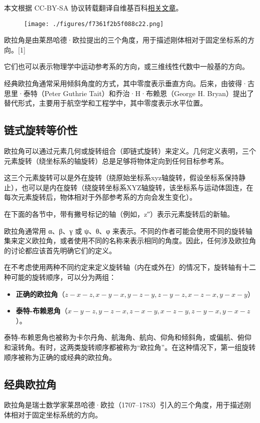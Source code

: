 
本文根据 CC-BY-SA 协议转载翻译自维基百科\href{https://en.wikipedia.org/wiki/Euler_angles}{相关文章}。
\begin{figure}[ht]
\centering
\texttt{[image: ./figures/f7361f2b5f088c22.png]}
\caption{} \label{fig_OLJ_1}
\end{figure}
欧拉角是由莱昂哈德·欧拉提出的三个角度，用于描述刚体相对于固定坐标系的方向。[1]

它们也可以表示物理学中运动参考系的方向，或三维线性代数中一般基的方向。

经典欧拉角通常采用倾斜角度的方式，其中零度表示垂直方向。后来，由彼得·古思里·泰特（Peter Guthrie Tait）和乔治·H·布赖恩（George H. Bryan）提出了替代形式，主要用于航空学和工程学中，其中零度表示水平位置。
\subsection{链式旋转等价性}
欧拉角可以通过元素几何或旋转组合（即链式旋转）来定义。几何定义表明，三个元素旋转（绕坐标系的轴旋转）总是足够将物体定向到任何目标参考系。

这三个元素旋转可以是外在旋转（绕原始坐标系xyz轴旋转，假设坐标系保持静止），也可以是内在旋转（绕旋转坐标系XYZ轴旋转，该坐标系与运动体固连，在每次元素旋转后，物体相对于外部参考系的方向会发生变化）。

在下面的各节中，带有撇号标记的轴（例如，z″）表示元素旋转后的新轴。

欧拉角通常用 α、β、γ 或 ψ、θ、φ 来表示。不同的作者可能会使用不同的旋转轴集来定义欧拉角，或者使用不同的名称来表示相同的角度。因此，任何涉及欧拉角的讨论都应该首先明确它们的定义。

在不考虑使用两种不同约定来定义旋转轴（内在或外在）的情况下，旋转轴有十二种可能的旋转顺序，可以分为两组：

\begin{itemize}
\item \textbf{正确的欧拉角}（\(z-x-z,x-y-x,y-z-y,z-y-z,x-z-x,y-x-y\)）
\item \textbf{泰特-布赖恩角}（\(x-y-z,y-z-x,z-x-y,x-z-y,z-y-x,y-x-z\)）。
\end{itemize}

泰特-布赖恩角也被称为卡尔丹角、航海角、航向、仰角和倾斜角，或偏航、俯仰和滚转角。有时，这两类旋转顺序都被称为“欧拉角”。在这种情况下，第一组旋转顺序被称为正确的或经典的欧拉角。
\subsection{经典欧拉角} 
欧拉角是瑞士数学家莱昂哈德·欧拉（1707–1783）引入的三个角度，用于描述刚体相对于固定坐标系统的方向。
